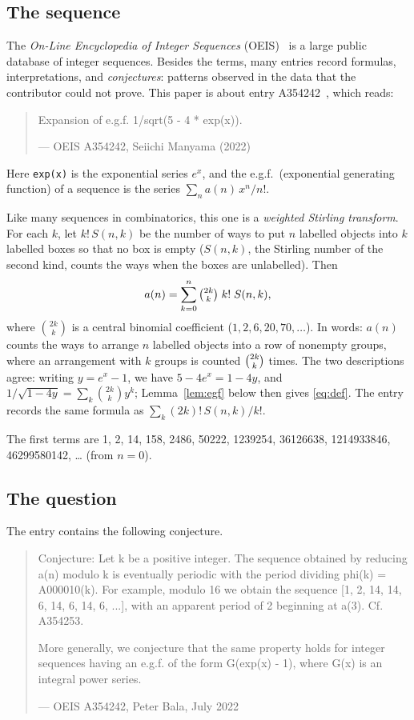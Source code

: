 \documentclass[11pt,a4paper]{article}
\theoremstyle{definition}
\theoremstyle{remark}
\begin{document}
\subsection{The sequence}\label{sec:sequence}
The \emph{On-Line Encyclopedia of Integer Sequences} (OEIS)~\cite{oeisdb} is a large public database of integer sequences.
Besides the terms, many entries record formulas, interpretations, and \emph{conjectures}: patterns observed in the data
that the contributor could not prove. This paper is about entry A354242~\cite{oeis}, which reads:
\begin{quote}\small\ttfamily\raggedright Expansion of e.g.f. 1/sqrt(5 - 4 * exp(x)).\par\smallskip\hfill\textrm{--- OEIS A354242, Seiichi Manyama (2022)}\end{quote}

Here \texttt{exp(x)} is the exponential series $e^x$, and the e.g.f.\ (exponential generating function) of a
sequence is the series $\sum_na(n)\,x^n/n!$.

Like many sequences in combinatorics, this one is a \emph{weighted Stirling transform}. For each $k$, let
$k!\,S(n,k)$ be the number of ways to put $n$ labelled objects into $k$ labelled boxes so that no box is empty
($S(n,k)$, the Stirling number of the second kind, counts the ways when the boxes are unlabelled). Then
\begin{equation}\label{eq:def}
a(n)=\sum_{k=0}^{n}\tbinom{2k}{k}\;k!\;S(n,k),
\end{equation}
where $\binom{2k}{k}$ is a central binomial coefficient ($1,2,6,20,70,\dots$). In words: $a(n)$ counts the ways to arrange $n$ labelled objects into a row of
nonempty groups, where an arrangement with $k$ groups is counted $\tbinom{2k}{k}$ times. The two descriptions agree: writing $y=e^x-1$, we have $5-4e^x=1-4y$, and
$1/\sqrt{1-4y}=\sum_k\binom{2k}{k}y^k$; Lemma~\ref{lem:egf} below then gives \eqref{eq:def}. The entry records the same
formula as $\sum_k(2k)!\,S(n,k)/k!$.

The first terms are 1, 2, 14, 158, 2486, 50222, 1239254, 36126638, 1214933846, 46299580142, \dots{} (from $n=0$).

\subsection{The question}
The entry contains the following conjecture.
\begin{quote}\small\ttfamily\raggedright Conjecture: Let k be a positive integer. The sequence obtained by reducing a(n) modulo k is eventually periodic with the period dividing phi(k) = A000010(k). For example, modulo 16 we obtain the sequence [1, 2, 14, 14, 6, 14, 6, 14, 6, ...], with an apparent period of 2 beginning at a(3). Cf. A354253.\par\smallskip More generally, we conjecture that the same property holds for integer sequences having an e.g.f. of the form G(exp(x) - 1), where G(x) is an integral power series.\par\smallskip\hfill\textrm{--- OEIS A354242, Peter Bala, July 2022}\end{quote}
\end{document}
